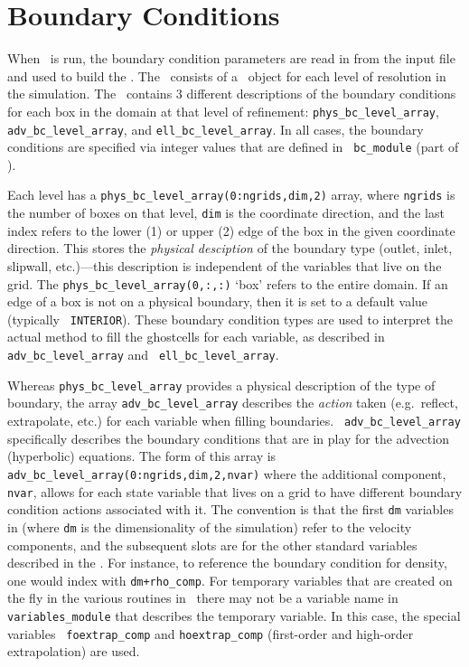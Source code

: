 \section{Boundary Conditions}

\label{sec:arch:bcs}

When \maestro\ is run, the boundary condition parameters are read in
from the input file and used to build the \bctower.  The
\bctower\ consists of a \bclevel\ object for each level of resolution
in the simulation.  The \bclevel\ contains 3 different descriptions of
the boundary conditions for each box in the domain at that level of
refinement: {\tt phys\_bc\_level\_array}, {\tt adv\_bc\_level\_array},
and {\tt ell\_bc\_level\_array}.  In all cases, the boundary
conditions are specified via integer values that are defined in {\tt
  bc\_module} (part of \amrex).

Each level has a {\tt phys\_bc\_level\_array(0:ngrids,dim,2)} array,
where {\tt ngrids} is the number of boxes on that level, {\tt dim} is
the coordinate direction, and the last index refers to the lower (1)
or upper (2) edge of the box in the given coordinate direction.  This
stores the {\em physical desciption} of the boundary type (outlet, inlet,
slipwall, etc.)---this description is independent of the variables
that live on the grid.  The {\tt phys\_bc\_level\_array(0,:,:)} `box'
refers to the entire domain.  If an edge of a box is not on a physical
boundary, then it is set to a default value (typically {\tt
  INTERIOR}).  These boundary condition types are used to interpret
the actual method to fill the ghostcells for each variable, as
described in {\tt adv\_bc\_level\_array} and {\tt
  ell\_bc\_level\_array}.


Whereas {\tt phys\_bc\_level\_array} provides a physical description
of the type of boundary, the array {\tt adv\_bc\_level\_array}
describes the {\em action} taken (e.g.\ reflect, extrapolate, etc.)
for each variable when filling boundaries.  {\tt
  adv\_bc\_level\_array} specifically describes the boundary
conditions that are in play for the advection (hyperbolic) equations.
The form of this array is {\tt
  adv\_bc\_level\_array(0:ngrids,dim,2,nvar)} where the additional
component, {\tt nvar}, allows for each state variable that lives on a
grid to have different boundary condition actions associated with it.
The convention is that the first {\tt dm} variables in \bclevel (where {\tt dm} is
the dimensionality of the simulation) refer to the
velocity components, and the subsequent slots are for the other
standard variables described in the .  For
instance, to reference the boundary condition for density, one would
index with {\tt dm+rho\_comp}.  For temporary variables that are
created on the fly in the various routines in \maestro\ there may not
be a variable name in {\tt variables\_module} that describes the
temporary variable.  In this case, the special variables {\tt
  foextrap\_comp} and {\tt hoextrap\_comp} (first-order and high-order
extrapolation) are used.

